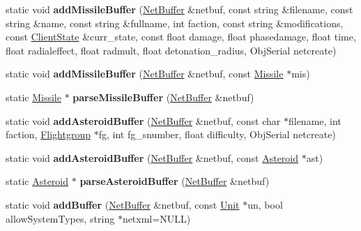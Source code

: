 \begin{DoxyCompactItemize}
\item 
static void {\bfseries add\+Missile\+Buffer} (\hyperlink{classNetBuffer}{Net\+Buffer} \&netbuf, const string \&filename, const string \&name, const string \&fullname, int faction, const string \&modifications, const \hyperlink{classClientState}{Client\+State} \&curr\+\_\+state, const float damage, float phasedamage, float time, float radialeffect, float radmult, float detonation\+\_\+radius, Obj\+Serial netcreate)\hypertarget{classUnitFactory_ab0b49925df88c1843a8ef1eff364974c}{}\label{classUnitFactory_ab0b49925df88c1843a8ef1eff364974c}

\item 
static void {\bfseries add\+Missile\+Buffer} (\hyperlink{classNetBuffer}{Net\+Buffer} \&netbuf, const \hyperlink{classMissile}{Missile} $\ast$mis)\hypertarget{classUnitFactory_a1931bc1e6bfbba621ae6539871b8d2e6}{}\label{classUnitFactory_a1931bc1e6bfbba621ae6539871b8d2e6}

\item 
static \hyperlink{classMissile}{Missile} $\ast$ {\bfseries parse\+Missile\+Buffer} (\hyperlink{classNetBuffer}{Net\+Buffer} \&netbuf)\hypertarget{classUnitFactory_ab01a90f5e4d8ac4f1650dc21161ee070}{}\label{classUnitFactory_ab01a90f5e4d8ac4f1650dc21161ee070}

\item 
static void {\bfseries add\+Asteroid\+Buffer} (\hyperlink{classNetBuffer}{Net\+Buffer} \&netbuf, const char $\ast$filename, int faction, \hyperlink{classFlightgroup}{Flightgroup} $\ast$fg, int fg\+\_\+snumber, float difficulty, Obj\+Serial netcreate)\hypertarget{classUnitFactory_a07f80b39da2d8217fa0ce510f1163fbc}{}\label{classUnitFactory_a07f80b39da2d8217fa0ce510f1163fbc}

\item 
static void {\bfseries add\+Asteroid\+Buffer} (\hyperlink{classNetBuffer}{Net\+Buffer} \&netbuf, const \hyperlink{classAsteroid}{Asteroid} $\ast$ast)\hypertarget{classUnitFactory_aac8d695a04399c7b5ca39762ba2075ee}{}\label{classUnitFactory_aac8d695a04399c7b5ca39762ba2075ee}

\item 
static \hyperlink{classAsteroid}{Asteroid} $\ast$ {\bfseries parse\+Asteroid\+Buffer} (\hyperlink{classNetBuffer}{Net\+Buffer} \&netbuf)\hypertarget{classUnitFactory_aeb38ab78e4c2a781d46b8bbae59ec00f}{}\label{classUnitFactory_aeb38ab78e4c2a781d46b8bbae59ec00f}

\item 
static void {\bfseries add\+Buffer} (\hyperlink{classNetBuffer}{Net\+Buffer} \&netbuf, const \hyperlink{classUnit}{Unit} $\ast$un, bool allow\+System\+Types, string $\ast$netxml=N\+U\+LL)\hypertarget{classUnitFactory_a7e81aee11df90accce23ff8e2aad3938}{}\label{classUnitFactory_a7e81aee11df90accce23ff8e2aad3938}


\end{DoxyCompactItemize}
